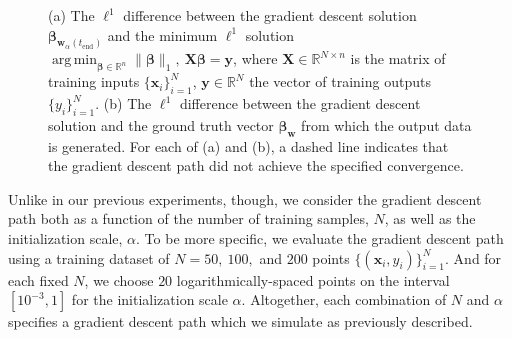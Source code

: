 \documentclass{article}
\DeclareMathOperator*{\argmin}{arg\,min}
\begin{document}
\begin{figure}[H]
    \centering
    \hfill
    \caption{(a) The $\ell^1$ difference between the gradient descent solution $\boldsymbol{\beta}_{\boldsymbol{w}_{\alpha}(t_{\text{end}})}$ and the minimum $\ell^1$ solution $\argmin_{\boldsymbol{\beta} \in \mathbb{R}^n} \| \boldsymbol{\beta} \|_1, \ \boldsymbol{X} \boldsymbol{\beta}  = \boldsymbol{y}$, where $\boldsymbol{X} \in \mathbb{R}^{N \times n}$ is the matrix of training inputs $\{ \boldsymbol{x}_i \}_{i=1}^N$, $\boldsymbol{y} \in \mathbb{R}^N$ the vector of training outputs $\{y_i\}_{i=1}^N$. (b) The $\ell^1$ difference between the gradient descent solution and the ground truth vector $\boldsymbol{\beta}_{\boldsymbol{w}}$ from which the output data is generated. For each of (a) and (b), a dashed line indicates that the gradient descent path did not achieve the specified convergence.}\label{fig:l1error}
\end{figure}

Unlike in our previous experiments, though, we consider the gradient descent path both as a function of the number of training samples, $N$, as well as the initialization scale, $\alpha$. To be more specific, we evaluate the gradient descent path using a training dataset of $N = 50, \ 100,$ and $200$ points $\{ (\boldsymbol{x}_i, y_i) \}_{i=1}^N$. And for each fixed $N$, we choose $20$ logarithmically-spaced points on the interval $[10^{-3}, 1]$ for the initialization scale $\alpha$. Altogether, each combination of $N$ and $\alpha$ specifies a gradient descent path which we simulate as previously described.
\end{document}
